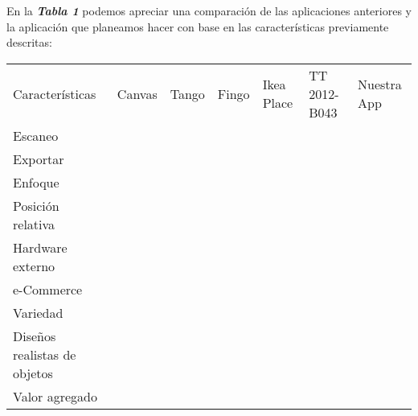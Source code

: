 En la \textbf{\textit{Tabla 1}} podemos apreciar una comparación de las aplicaciones anteriores y la aplicación que planeamos hacer con base en las características previamente descritas:\par

\begin{table}[]
	\centering
	\begin{tabular}{lllllll}
		Características              & Canvas                   & Tango                    & Fingo                    & Ikea Place               & TT 2012-B043             & Nuestra App              \\
		Escaneo                      & \cellcolor[HTML]{BFBFBF} &                          & \cellcolor[HTML]{BFBFBF} &                          & \cellcolor[HTML]{BFBFBF} & \cellcolor[HTML]{BFBFBF} \\
		Exportar                     & \cellcolor[HTML]{BFBFBF} &                          &                          &                          &                          &                          \\
		Enfoque                      &                          & \cellcolor[HTML]{BFBFBF} &                          & \cellcolor[HTML]{BFBFBF} & \cellcolor[HTML]{BFBFBF} & \cellcolor[HTML]{BFBFBF} \\
		Posición relativa            &                          & \cellcolor[HTML]{BFBFBF} &                          & \cellcolor[HTML]{BFBFBF} &                          & \cellcolor[HTML]{BFBFBF} \\
		Hardware externo             & \cellcolor[HTML]{BFBFBF} &                          & \cellcolor[HTML]{BFBFBF} & \cellcolor[HTML]{BFBFBF} & \cellcolor[HTML]{BFBFBF} &                          \\
		e-Commerce                   &                          &                          &                          &                          &                          & \cellcolor[HTML]{BFBFBF} \\
		Variedad                     &                          &                          & \cellcolor[HTML]{BFBFBF} &                          & \cellcolor[HTML]{BFBFBF} & \cellcolor[HTML]{BFBFBF} \\
		Diseños realistas de objetos &                          & \cellcolor[HTML]{BFBFBF} & \cellcolor[HTML]{BFBFBF} & \cellcolor[HTML]{BFBFBF} &                          & \cellcolor[HTML]{BFBFBF} \\
		Valor agregado               &                          &                          &                          &                          &                          & \cellcolor[HTML]{BFBFBF}
	\end{tabular}
\end{table}

  